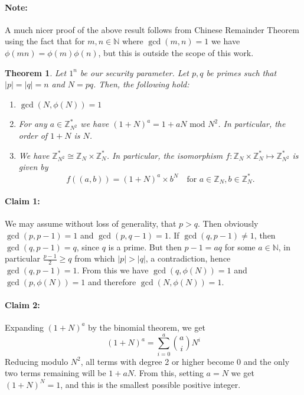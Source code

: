 \documentclass{article}
\newtheorem{theorem}{Theorem}[section]
\theoremstyle{definition}
\theoremstyle{example}
\newcommand{\Int}{\mathbb{Z}}
\newcommand{\Nat}{\mathbb{N}}
\renewcommand{\mod}{\,\,\text{mod}\,\,}
\begin{document}
\paragraph{Note:} A much nicer proof of the above result follows from Chinese
Remainder Theorem using the fact that for $m, n \in \Nat$ where $\gcd(m, n) = 1$
we have $\phi(mn) = \phi(m)\phi(n)$, but this is outside the scope of this work. 
\begin{theorem}
  \label{thm:paillierthms}
Let $1^n$ be our security parameter. Let $p, q$ be primes such that
$|p| = |q| = n$ and $N = pq$. Then, the following hold:
\begin{enumerate}
\item $\gcd(N, \phi(N)) = 1$
\item For any $a \in \Int_{N^2}^*$ we have $(1 + N)^a = 1 + aN \mod N^2$. In
  particular, the order of $1 + N$ is $N$.
\item We have $\Int_{N^2}^* \cong \Int_{N} \times \Int_{N}^*$.
In particular, the isomorphism $f:\Int_{N} \times \Int_{N}^* \mapsto \Int_{N^2}^*$
is given by
\[
   f((a, b)) = (1 + N)^a \times b^N \quad\text{for}\,\, a \in \Int_{N}, b \in \Int_{N}^*.
\]
\end{enumerate}  
\end{theorem}
\paragraph{Claim 1:} We may assume without loss of generality, that $p > q$.
Then obviously $\gcd(p, p - 1) = 1$ and $\gcd(p, q - 1) = 1$. If $\gcd(q, p - 1)
\neq 1$, then $\gcd(q, p - 1) = q$, since $q$ is a prime. But then $p - 1 = aq$
for some $a \in \Nat$, in particular $\frac{p - 1}{2} \geq q$ from which $|p| >
|q|$, a contradiction, hence $\gcd(q, p - 1) = 1$. From this we have $\gcd(q,
\phi(N)) = 1$ and $\gcd(p, \phi(N)) = 1$ and therefore $\gcd(N, \phi(N)) = 1$.
\paragraph{Claim 2:} Expanding $(1 + N)^a$ by the binomial theorem, we get
\[
  (1 + N)^a = \sum_{i =0}^a \binom{a}{i} N^i
\]
Reducing modulo $N^2$, all terms with degree 2 or higher become 0 and the only
two terms remaining will be $1 + aN$. From this, setting $a = N$ we get $(1 +
N)^N = 1$, and this is the smallest possible positive integer.
\end{document}
